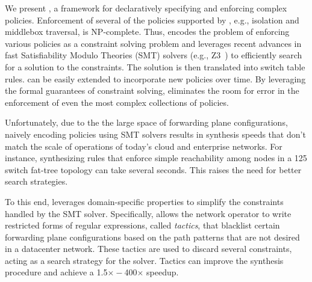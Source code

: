 We present \Name, a framework for declaratively specifying and
enforcing complex policies. Enforcement of several of
the policies supported by \Name, e.g., isolation and middlebox
traversal, is NP-complete. Thus, \Name 
encodes the problem of enforcing various
policies as a constraint solving problem and
leverages recent advances in
fast Satisfiability Modulo Theories (SMT) solvers (e.g., Z3~\cite{z3})
to efficiently search for a solution to the constraints. 
The solution is then translated into switch table rules. %
\Name can be easily extended to incorporate new policies over time. By
leveraging the formal guarantees of constraint solving, \Name
eliminates the room for error in the enforcement of even the most
complex collections of policies.

Unfortunately, 
due to the the large space of forwarding plane configurations,
naively encoding policies using SMT solvers results in
synthesis speeds that don't match the scale of operations of 
today's cloud and enterprise networks.
For instance, synthesizing 
rules that enforce simple
reachability among nodes in a 125 switch fat-tree topology can take
several seconds. This raises the need for better search strategies.

To this
end, \Name leverages domain-specific properties to simplify the
constraints handled by the SMT solver.  Specifically, \Name allows the
network operator to write 
restricted forms of regular expressions, called \emph{tactics}, 
that blacklist certain
forwarding plane configurations based on the path patterns   
that are not desired in a datacenter network. 
These tactics are used to discard several constraints, 
acting as a search strategy for the solver.
Tactics can improve the synthesis procedure and achieve
a 1.5$\times - $400$\times$ speedup. 

